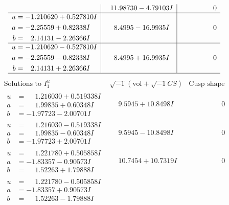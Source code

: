 \documentclass[1p]{elsarticle_modified}
\theoremstyle{definition}
\newcommand{\I}{\sqrt{-1}}
\begin{document}
$$\begin{array}{c|c|c}
 & \phantom{-}11.98730 - 4.79103 I & \phantom{-0.000000 } 0 \\ \hline\begin{aligned}
u &= -1.210620 + 0.527810 I \\
a &= -2.25559 + 0.82338 I \\
b &= \phantom{-}2.14131 - 2.26366 I\end{aligned}
 & \phantom{-}8.4995 - 16.9935 I & \phantom{-0.000000 } 0 \\ \hline\begin{aligned}
u &= -1.210620 - 0.527810 I \\
a &= -2.25559 - 0.82338 I \\
b &= \phantom{-}2.14131 + 2.26366 I\end{aligned}
 & \phantom{-}8.4995 + 16.9935 I & \phantom{-0.000000 } 0\\
 \hline 
 \end{array}$$\newpage$$\begin{array}{c|c|c}  
\text{Solutions to }I^u_{1}& \I (\text{vol} + \sqrt{-1}CS) & \text{Cusp shape}\\
 \hline 
\begin{aligned}
u &= \phantom{-}1.216030 + 0.519338 I \\
a &= \phantom{-}1.99835 + 0.60348 I \\
b &= -1.97723 - 2.00701 I\end{aligned}
 & \phantom{-}9.5945 + 10.8498 I & \phantom{-0.000000 } 0 \\ \hline\begin{aligned}
u &= \phantom{-}1.216030 - 0.519338 I \\
a &= \phantom{-}1.99835 - 0.60348 I \\
b &= -1.97723 + 2.00701 I\end{aligned}
 & \phantom{-}9.5945 - 10.8498 I & \phantom{-0.000000 } 0 \\ \hline\begin{aligned}
u &= \phantom{-}1.221780 + 0.505858 I \\
a &= -1.83357 - 0.90573 I \\
b &= \phantom{-}1.52263 + 1.79888 I\end{aligned}
 & \phantom{-}10.7454 + 10.7319 I & \phantom{-0.000000 } 0 \\ \hline\begin{aligned}
u &= \phantom{-}1.221780 - 0.505858 I \\
a &= -1.83357 + 0.90573 I \\
b &= \phantom{-}1.52263 - 1.79888 I\end{aligned}

\end{array}$$
\end{document}
